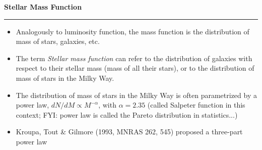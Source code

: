 \documentclass[letterpaper,landscape]{slides}
\begin{document}
%
%
%


\begin{slide}
\begin{center}
\bfseries
{\large {\color{red} Stellar Mass Function}}
\end{center}
\vskip 0.2in
\hrule

\begin{itemize}
\item Analogously to luminosity function, the mass function is the distribution of mass of stars,
galaxies, etc. 
\item The term {\it Stellar mass function} can refer to the distribution of galaxies with respect
to their stellar mass (mass of all their stars), or to the distribution of mass of stars in the Milky Way. 
\item The distribution of mass of stars in the Milky Way is often parametrized by a power law, $dN/dM \propto M^{-\alpha}$,
with $\alpha=2.35$ (called Salpeter function in this context; FYI: power law is called the Pareto distribution in statistics...)
\item Kroupa, Tout \& Gilmore (1993, MNRAS 262, 545) proposed a three-part power law
\end{itemize}

\vfill
\end{slide}
 
\end{document}
